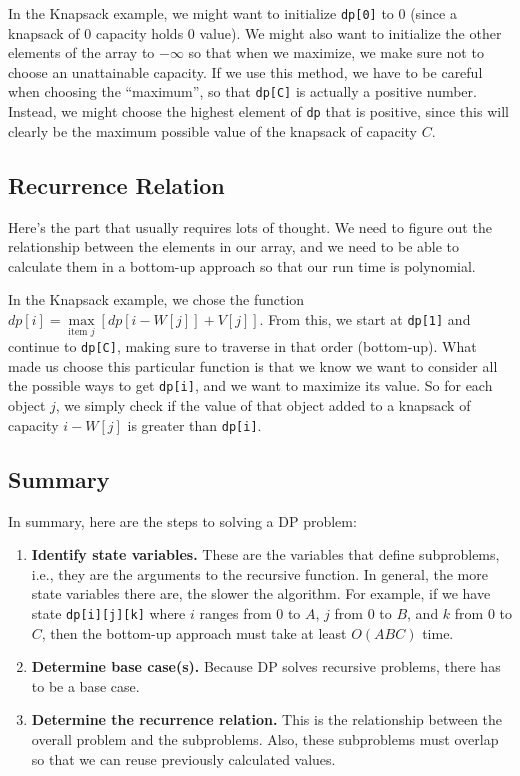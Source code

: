 In the Knapsack example, we might want to initialize \verb=dp[0]= to $0$ (since a knapsack of $0$ capacity holds $0$ value).  We might also want to initialize the other elements of the array to $-\infty$ so that when we maximize, we make sure not to choose an unattainable capacity.  If we use this method, we have to be careful when choosing the ``maximum'', so that \verb=dp[C]= is actually a positive number.  Instead, we might choose the highest element of \verb=dp= that is positive, since this will clearly be the maximum possible value of the knapsack of capacity $C$.

\subsection{Recurrence Relation}
Here's the part that usually requires lots of thought.  We need to figure out the relationship between the elements in our array, and we need to be able to calculate them in a bottom-up approach so that our run time is polynomial.

In the Knapsack example, we chose the function $dp[i] = \max\limits_{\text{item } j} \left[dp[i-W[j]]+V[j]\right]$.  From this, we start at \verb=dp[1]= and continue to \verb=dp[C]=, making sure to traverse in that order (bottom-up).  What made us choose this particular function is that we know we want to consider all the possible ways to get \verb=dp[i]=, and we want to maximize its value.  So for each object $j$, we simply check if the value of that object added to a knapsack of capacity $i-W[j]$ is greater than \verb=dp[i]=.

\subsection{Summary}
In summary, here are the steps to solving a DP problem:

\begin{enumerate}
    \item \textbf{Identify state variables.} These are the variables that define subproblems, i.e., they are the arguments to the recursive function. In general, the more state variables there are, the slower the algorithm. For example, if we have state \texttt{dp[i][j][k]} where $i$ ranges from 0 to $A$, $j$ from 0 to $B$, and $k$ from 0 to $C$, then the bottom-up approach must take at least $O(ABC)$ time.
    \item \textbf{Determine base case(s).} Because DP solves recursive problems, there has to be a base case.
    \item \textbf{Determine the recurrence relation.} This is the relationship between the overall problem and the subproblems. Also, these subproblems must overlap so that we can reuse previously calculated values.
\end{enumerate}